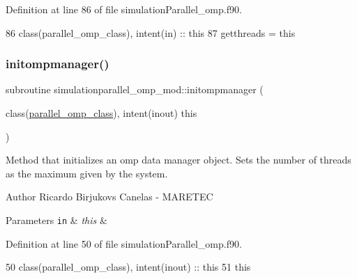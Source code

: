 Definition at line 86 of file simulation\+Parallel\+\_\+omp.\+f90.


\begin{DoxyCode}
86     \textcolor{keywordtype}{class}(parallel\_omp\_class), \textcolor{keywordtype}{intent(in)} :: this
87     getthreads = this%
\end{DoxyCode}
\mbox{\label{namespacesimulationparallel__omp__mod_a43af0d6de562e53dfbaa874bce957ba9}} 
\subsubsection{\texorpdfstring{initompmanager()}{initompmanager()}}
{\footnotesize\ttfamily subroutine simulationparallel\+\_\+omp\+\_\+mod\+::initompmanager (\begin{DoxyParamCaption}\item[{class(\mbox{\hyperlink{structsimulationparallel__omp__mod_1_1parallel__omp__class}{parallel\+\_\+omp\+\_\+class}}), intent(inout)}]{this }\end{DoxyParamCaption})\hspace{0.3cm}{\ttfamily [private]}}



Method that initializes an omp data manager object. Sets the number of threads as the maximum given by the system. 

\begin{DoxyAuthor}{Author}
Ricardo Birjukovs Canelas -\/ M\+A\+R\+E\+T\+EC 
\end{DoxyAuthor}

\begin{DoxyParams}[1]{Parameters}
\mbox{\tt in}  & {\em this} & \\
\hline
\end{DoxyParams}


Definition at line 50 of file simulation\+Parallel\+\_\+omp.\+f90.


\begin{DoxyCode}
50     \textcolor{keywordtype}{class}(parallel\_omp\_class), \textcolor{keywordtype}{intent(inout)} :: this
51     this%
\end{DoxyCode}
\mbox{\label{namespacesimulationparallel__omp__mod_ac5d0e4616b102fc7f4edddf8285fb61f}} 
